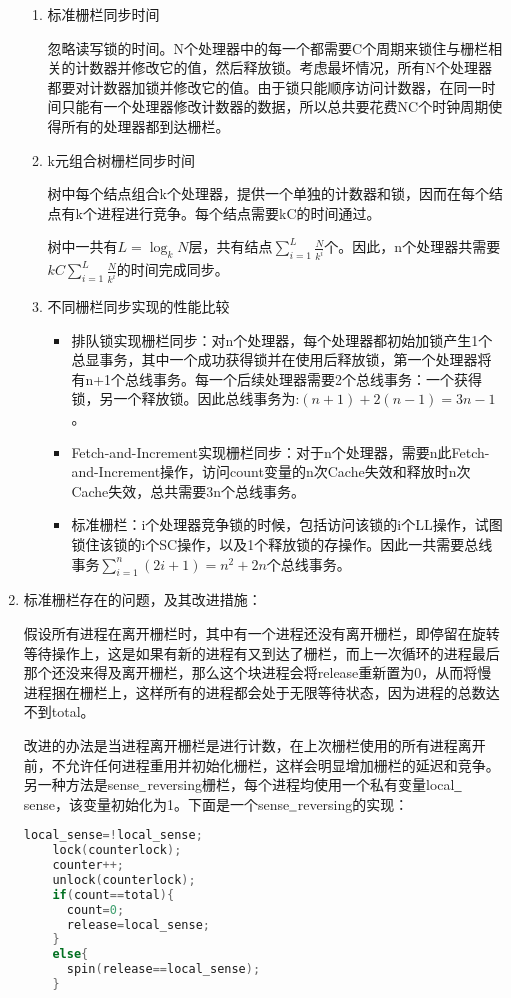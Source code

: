 \documentclass[a4paper]{ctexart}
\newcommand{\li}{\uline{\hspace{0.5em}}}
\begin{document}
\begin{enumerate}
\begin{enumerate}
    \item 标准栅栏同步时间
    
    忽略读写锁的时间。N个处理器中的每一个都需要C个周期来锁住与栅栏相关的计数器并修改它的值，然后释放锁。考虑最坏情况，所有N个处理器都要对计数器加锁并修改它的值。由于锁只能顺序访问计数器，在同一时间只能有一个处理器修改计数器的数据，所以总共要花费NC个时钟周期使得所有的处理器都到达栅栏。
    
    \item k元组合树栅栏同步时间
    
    树中每个结点组合k个处理器，提供一个单独的计数器和锁，因而在每个结点有k个进程进行竞争。每个结点需要kC的时间通过。
    
    树中一共有$L=\log_kN$层，共有结点$\sum_{i=1}^{L}\frac{N}{k^i}$个。因此，n个处理器共需要$kC\sum_{i=1}^{L}\frac{N}{k^i}$的时间完成同步。
      
    \item 不同栅栏同步实现的性能比较
    \begin{itemize}
      \item 排队锁实现栅栏同步：对n个处理器，每个处理器都初始加锁产生1个总显事务，其中一个成功获得锁并在使用后释放锁，第一个处理器将有n+1个总线事务。每一个后续处理器需要2个总线事务：一个获得锁，另一个释放锁。因此总线事务为:$(n+1)+2(n-1)=3n-1$。
      \item Fetch-and-Increment实现栅栏同步：对于n个处理器，需要n此Fetch-and-Increment操作，访问count变量的n次Cache失效和释放时n次Cache失效，总共需要3n个总线事务。
      \item 标准栅栏：i个处理器竞争锁的时候，包括访问该锁的i个LL操作，试图锁住该锁的i个SC操作，以及1个释放锁的存操作。因此一共需要总线事务$\sum_{i=1}^n(2i+1)=n^2+2n$个总线事务。
    \end{itemize}
    
  \end{enumerate}
  
  \item 标准栅栏存在的问题，及其改进措施：
  
  假设所有进程在离开栅栏时，其中有一个进程还没有离开栅栏，即停留在旋转等待操作上，这是如果有新的进程有又到达了栅栏，而上一次循环的进程最后那个还没来得及离开栅栏，那么这个块进程会将release重新置为0，从而将慢进程捆在栅栏上，这样所有的进程都会处于无限等待状态，因为进程的总数达不到total。
  
  改进的办法是当进程离开栅栏是进行计数，在上次栅栏使用的所有进程离开前，不允许任何进程重用并初始化栅栏，这样会明显增加栅栏的延迟和竞争。
  另一种方法是sense$\li$reversing栅栏，每个进程均使用一个私有变量local$\li$sense，该变量初始化为1。下面是一个sense$\li$reversing的实现：
  \begin {lstlisting}[language=c]
    local_sense=!local_sense;
    lock(counterlock);
    counter++;
    unlock(counterlock);
    if(count==total){
      count=0;
      release=local_sense;
    }
    else{
      spin(release==local_sense);
    }
  \end{lstlisting}
    

\end{enumerate}
\end{document}
